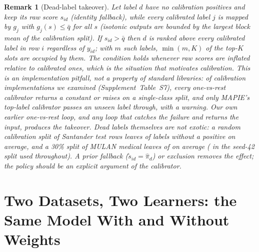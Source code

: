 \documentclass[sigconf,nonacm]{acmart}
\newtheorem{remark}{Remark}
\newcommand{\Supp}[1]{Supplement~#1}  %
\begin{document}
\begin{remark}[Dead-label takeover]
\label{prop:dead}
Let label $d$ have no calibration positives and keep its raw score $s_{id}$ (identity fallback), while every calibrated label $j$ is mapped by $g_j$ with $g_j(s)\le\bar q$ for all $s$ (isotonic outputs are bounded by the largest block mean of the calibration split). If $s_{id}>\bar q$ then $d$ is ranked above every calibrated label in row $i$ regardless of $y_{id}$; with $m$ such labels, $\min(m,K)$ of the top-$K$ slots are occupied by them. The condition holds whenever raw scores are inflated relative to calibrated ones, which is the situation that motivates calibration. This is an implementation pitfall, not a property of standard libraries: of \nnSurveyImpl{} calibration implementations we examined (\Supp{Table~S7}), every one-vs-rest calibrator returns a constant or raises on a single-class split, and only MAPIE's top-label calibrator passes an unseen label through, with a warning. Our own earlier one-vs-rest loop, and any loop that catches the failure and returns the input, produces the takeover. Dead labels themselves are not exotic: a random calibration split of \ndeadFreqSantOnePctNcal{} Santander test rows leaves \ndeadFreqSantOnePct{} of \nnLabels{} labels without a positive on average, and a 30\% split of MULAN medical leaves \ndeadFreqMedicalThirty{} of \nmedL{} on average (\nmedDeadCal{} in the seed-42 split used throughout). A prior fallback ($\tilde s_{id}=\hat\pi_d$) or exclusion removes the effect; the policy should be an explicit argument of the calibrator.
\end{remark}

\section{Two Datasets, Two Learners: the Same Model With and Without Weights}
\label{sec:santander}
\end{document}
